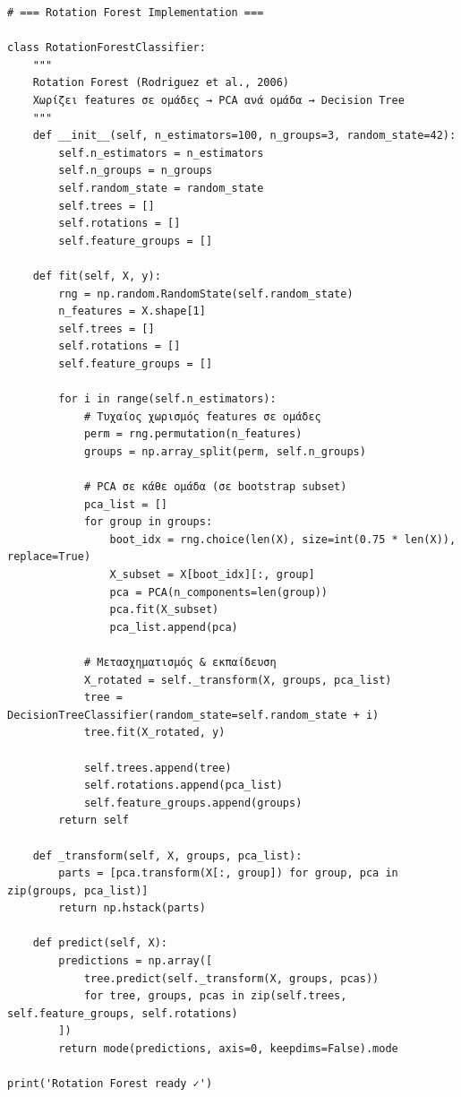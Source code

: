 \begin{lstlisting}
# === Rotation Forest Implementation ===
 
class RotationForestClassifier:
    """
    Rotation Forest (Rodriguez et al., 2006)
    Χωρίζει features σε ομάδες → PCA ανά ομάδα → Decision Tree
    """
    def __init__(self, n_estimators=100, n_groups=3, random_state=42):
        self.n_estimators = n_estimators
        self.n_groups = n_groups
        self.random_state = random_state
        self.trees = []
        self.rotations = []
        self.feature_groups = []
 
    def fit(self, X, y):
        rng = np.random.RandomState(self.random_state)
        n_features = X.shape[1]
        self.trees = []
        self.rotations = []
        self.feature_groups = []
 
        for i in range(self.n_estimators):
            # Τυχαίος χωρισμός features σε ομάδες
            perm = rng.permutation(n_features)
            groups = np.array_split(perm, self.n_groups)
 
            # PCA σε κάθε ομάδα (σε bootstrap subset)
            pca_list = []
            for group in groups:
                boot_idx = rng.choice(len(X), size=int(0.75 * len(X)), replace=True)
                X_subset = X[boot_idx][:, group]
                pca = PCA(n_components=len(group))
                pca.fit(X_subset)
                pca_list.append(pca)
 
            # Μετασχηματισμός & εκπαίδευση
            X_rotated = self._transform(X, groups, pca_list)
            tree = DecisionTreeClassifier(random_state=self.random_state + i)
            tree.fit(X_rotated, y)
 
            self.trees.append(tree)
            self.rotations.append(pca_list)
            self.feature_groups.append(groups)
        return self
 
    def _transform(self, X, groups, pca_list):
        parts = [pca.transform(X[:, group]) for group, pca in zip(groups, pca_list)]
        return np.hstack(parts)
 
    def predict(self, X):
        predictions = np.array([
            tree.predict(self._transform(X, groups, pcas))
            for tree, groups, pcas in zip(self.trees, self.feature_groups, self.rotations)
        ])
        return mode(predictions, axis=0, keepdims=False).mode
 
print('Rotation Forest ready ✓')
\end{lstlisting}
 
